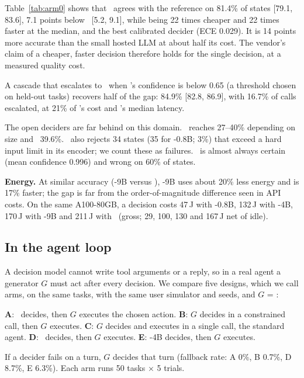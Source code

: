 Table~\ref{tab:arm0} shows that \jev\ agrees with the reference on 81.4\% of states [79.1, 83.6], 7.1 points below \gbig\ [5.2, 9.1], while being 22 times cheaper and 22 times faster at the median, and the best calibrated decider (ECE 0.029).
It is 14 points more accurate than the small hosted LLM at about half its cost.
The vendor's claim of a cheaper, faster decision therefore holds for the single decision, at a measured quality cost.

A cascade that escalates to \gbig\ when \jev's confidence is below 0.65 (a threshold chosen on held-out tasks) recovers half of the gap: 84.9\% [82.8, 86.9], with 16.7\% of calls escalated, at 21\% of \gbig's cost and \jev's median latency.

The open deciders are far behind on this domain.
\kev\ reaches 27--40\% depending on size and \qwen\ 39.6\%.
\kev\ also rejects 34 states (35 for \kev-0.8B; 3\%) that exceed a hard input limit in its encoder; we count these as failures.
\qwen\ is almost always certain (mean confidence 0.996) and wrong on 60\% of states.

\textbf{Energy.} At similar accuracy (\kev-9B versus \qwen), \kev-9B uses about 20\% less energy and is 17\% faster; the gap is far from the order-of-magnitude difference seen in API costs.
On the same A100-80GB, a decision costs 47\,J with \kev-0.8B, 132\,J with \kev-4B, 170\,J with \kev-9B and 211\,J with \qwen\ (gross; 29, 100, 130 and 167\,J net of idle).

\subsection{In the agent loop}

A decision model cannot write tool arguments or a reply, so in a real agent a generator $G$ must act after every decision.
We compare five designs, which we call arms, on the same tasks, with the same user simulator and seeds, and $G$ = \gbig:

\textbf{A}: \jev\ decides, then $G$ executes the chosen action.
\textbf{B}: $G$ decides in a constrained call, then $G$ executes.
\textbf{C}: $G$ decides and executes in a single call, the standard agent.
\textbf{D}: \goss\ decides, then $G$ executes.
\textbf{E}: \kev-4B decides, then $G$ executes.

If a decider fails on a turn, $G$ decides that turn (fallback rate: A 0\%, B 0.7\%, D 8.7\%, E 6.3\%).
Each arm runs 50 tasks $\times$ 5 trials.

